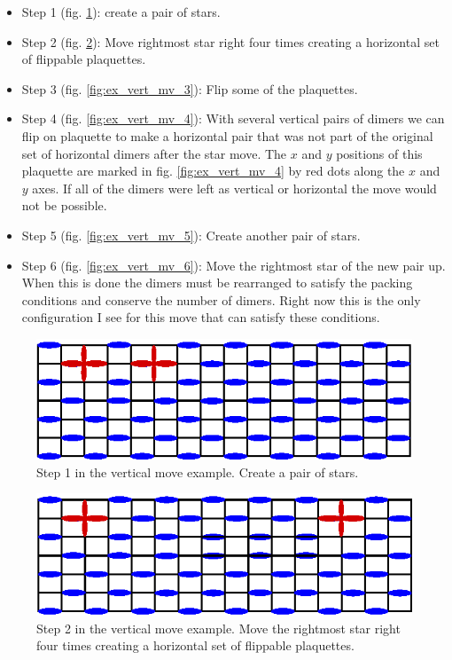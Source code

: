 \documentclass[aps,floatfix,11pt]{revtex4-1}
\begin{document}
\begin{itemize}
    \item 
    Step 1 (fig. \ref{fig:ex_vert_mv_1}): create a pair of stars.
    
    \item 
    Step 2 (fig. \ref{fig:ex_vert_mv_2}): Move rightmost star right four times creating a horizontal set of
    flippable plaquettes.
    
    \item
    Step 3 (fig. \ref{fig:ex_vert_mv_3}): Flip some of the plaquettes. 
    
    \item
    Step 4 (fig. \ref{fig:ex_vert_mv_4}): With several vertical pairs of dimers we can flip on plaquette to make a
    horizontal pair that was not part of the original set of horizontal dimers after the star move. The
    $x$ and $y$ positions of this plaquette are marked in fig. \ref{fig:ex_vert_mv_4} by red dots along the $x$ and $y$
    axes. If all of the dimers were left as vertical or horizontal the move would not be possible.
    
    \item
    Step 5 (fig. \ref{fig:ex_vert_mv_5}): Create another pair of stars.
    
    \item
    Step 6 (fig. \ref{fig:ex_vert_mv_6}): Move the rightmost star of the new pair up. When this is done
    the dimers must be rearranged to satisfy the packing conditions and conserve the number of dimers.
    Right now this is the only configuration I see for this move that can satisfy these conditions.
\end{itemize}


\begin{figure}[h]
    \centering
    \includegraphics[width=8.5 cm]{ex_vert_mv_1}
    \caption{Step 1 in the vertical move example. Create a pair of stars.\label{fig:ex_vert_mv_1}}
\end{figure}

\begin{figure}[h]
    \centering
    \includegraphics[width=8.5 cm]{ex_vert_mv_2}
    \caption{Step 2 in the vertical move example. Move the rightmost star right four times creating
    a horizontal set of flippable plaquettes.\label{fig:ex_vert_mv_2}}
\end{figure}
\end{document}
